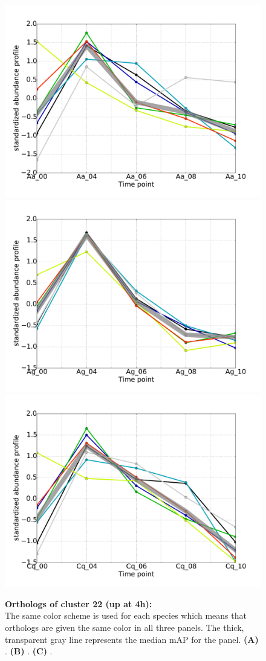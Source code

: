 \begin{figure}[hp]
% 
\subcaptionbox{\label{fig:cluster22-Aa}}
{\includegraphics[width=.5\linewidth]{figures/figs/ecr_and_insects_ptci_20130918_orthodb7/upAt4_gene_profiles_from_cummerbund/Aa_upAt4_cls22_Ag_target_FPKMs_vb_orthos.pdf}}
%
\subcaptionbox{\label{fig:cluster22-Ag}}
{\includegraphics[width=.5\linewidth]{figures/figs/ecr_and_insects_ptci_20130918_orthodb7/upAt4_gene_profiles_from_cummerbund/Ag_upAt4_cls22_Ag_target_FPKMs_vb_orthos.pdf}}
%
\subcaptionbox{\label{fig:cluster22-Cq}}
{\includegraphics[width=.5\linewidth]{figures/figs/ecr_and_insects_ptci_20130918_orthodb7/upAt4_gene_profiles_from_cummerbund/Cq_upAt4_cls22_Ag_target_FPKMs_vb_orthos.pdf}}
% 
\caption[Orthologs of cluster 22]{\sf \textbf{Orthologs of cluster 22 (up at 4h):}\\
The same color scheme is used for each species which means that orthologs are given the same color in all three panels.
The thick, transparent gray line represents the median \gls{mAP} for the panel.
\textbf{(A)} \Aa.
\textbf{(B)} \Ag.
\textbf{(C)} \Cq.
}\label{fig:cluster22}
\end{figure}